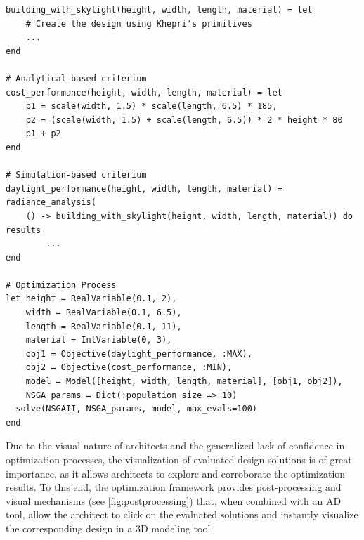 \begin{lstlisting}[caption={BPO example of the framework's API using the Khepri AD tool.},label=BPOjuliaCode]	
building_with_skylight(height, width, length, material) = let
	# Create the design using Khepri's primitives
	...
end

# Analytical-based criterium
cost_performance(height, width, length, material) = let
	p1 = scale(width, 1.5) * scale(length, 6.5) * 185,
	p2 = (scale(width, 1.5) + scale(length, 6.5)) * 2 * height * 80
	p1 + p2
end

# Simulation-based criterium
daylight_performance(height, width, length, material) = radiance_analysis(
	() -> building_with_skylight(height, width, length, material)) do results
		...
end

# Optimization Process
let height = RealVariable(0.1, 2),
	width = RealVariable(0.1, 6.5),
	length = RealVariable(0.1, 11),
	material = IntVariable(0, 3),
	obj1 = Objective(daylight_performance, :MAX),
	obj2 = Objective(cost_performance, :MIN),
	model = Model([height, width, length, material], [obj1, obj2]),
	NSGA_params = Dict(:population_size => 10)
  solve(NSGAII, NSGA_params, model, max_evals=100)
end
\end{lstlisting}

Due to the visual nature of architects and the generalized lack of confidence in optimization processes, the visualization of evaluated design solutions is of great importance, as it allows architects to explore and corroborate the optimization results. To this end, the optimization framework provides post-processing and visual mechanisms (see \cref{fig:postprocessing}) that, when combined with an \ac{AD} tool, allow the architect to click on the evaluated solutions and instantly visualize the corresponding design in a 3D modeling tool. 


